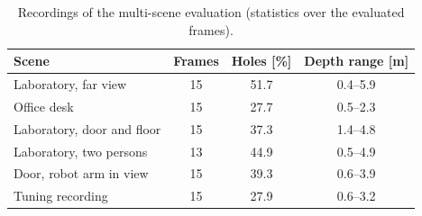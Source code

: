 \documentclass[conference]{IEEEtran}
\begin{document}
\begin{table}[t]
\centering
\caption{Recordings of the multi-scene evaluation (statistics over the
evaluated frames).}
\label{tab:scenes}
\footnotesize
\setlength{\tabcolsep}{3pt}
\begin{tabular}{@{}lccc@{}}
\toprule
Scene & Frames & Holes [\%] & Depth range [m] \\
\midrule
Laboratory, far view          & 15 & 51.7 & 0.4--5.9 \\
Office desk                   & 15 & 27.7 & 0.5--2.3 \\
Laboratory, door and floor    & 15 & 37.3 & 1.4--4.8 \\
Laboratory, two persons       & 13 & 44.9 & 0.5--4.9 \\
Door, robot arm in view       & 15 & 39.3 & 0.6--3.9 \\
Tuning recording              & 15 & 27.9 & 0.6--3.2 \\
\bottomrule
\end{tabular}
\end{table}
\end{document}

